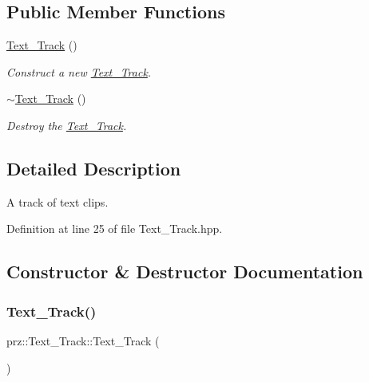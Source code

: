 \subsection*{Public Member Functions}
\begin{DoxyCompactItemize}
\item 
\mbox{\hyperlink{classprz_1_1_text___track_ac87a34649f6084c8a048b0fa3ebcef33}{Text\+\_\+\+Track}} ()
\begin{DoxyCompactList}\small\item\em Construct a new \mbox{\hyperlink{classprz_1_1_text___track}{Text\+\_\+\+Track}}. \end{DoxyCompactList}\item 
\mbox{\hyperlink{classprz_1_1_text___track_afc271eaf47473488c65986d56c9bdc51}{$\sim$\+Text\+\_\+\+Track}} ()
\begin{DoxyCompactList}\small\item\em Destroy the \mbox{\hyperlink{classprz_1_1_text___track}{Text\+\_\+\+Track}}. \end{DoxyCompactList}\end{DoxyCompactItemize}


\subsection{Detailed Description}
A track of text clips. 



Definition at line 25 of file Text\+\_\+\+Track.\+hpp.



\subsection{Constructor \& Destructor Documentation}
\mbox{\label{classprz_1_1_text___track_ac87a34649f6084c8a048b0fa3ebcef33}} 
\subsubsection{\texorpdfstring{Text\_Track()}{Text\_Track()}}
{\footnotesize\ttfamily prz\+::\+Text\+\_\+\+Track\+::\+Text\+\_\+\+Track (\begin{DoxyParamCaption}{ }\end{DoxyParamCaption})\hspace{0.3cm}{\ttfamily [inline]}}



